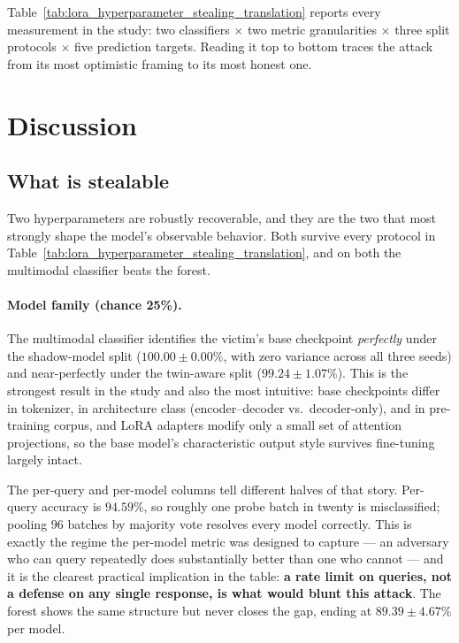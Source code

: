 \documentclass[11pt]{article}
\begin{document}
Table~\ref{tab:lora_hyperparameter_stealing_translation} reports every measurement in the
study: two classifiers $\times$ two metric granularities $\times$ three split protocols
$\times$ five prediction targets. Reading it top to bottom traces the attack from its most
optimistic framing to its most honest one.

\section{Discussion}

\subsection{What is stealable}

Two hyperparameters are robustly recoverable, and they are the two that most strongly
shape the model's observable behavior. Both survive every protocol in
Table~\ref{tab:lora_hyperparameter_stealing_translation}, and on both the multimodal
classifier beats the forest.

\paragraph{Model family (chance 25\%).} The multimodal classifier identifies the victim's
base checkpoint \emph{perfectly} under the shadow-model split ($100.00 \pm 0.00\%$, with
zero variance across all three seeds) and near-perfectly under the twin-aware split
($99.24 \pm 1.07\%$). This is the strongest result in the study and also the most
intuitive: base checkpoints differ in tokenizer, in architecture class (encoder--decoder
vs.\ decoder-only), and in pre-training corpus, and LoRA adapters modify only a small set
of attention projections, so the base model's characteristic output style survives
fine-tuning largely intact.

The per-query and per-model columns tell different halves of that story. Per-query
accuracy is $94.59\%$, so roughly one probe batch in twenty is misclassified; pooling $96$
batches by majority vote resolves every model correctly. This is exactly the regime the
per-model metric was designed to capture --- an adversary who can query repeatedly does
substantially better than one who cannot --- and it is the clearest practical implication
in the table: \textbf{a rate limit on queries, not a defense on any single response, is
what would blunt this attack}. The forest shows the same structure but never closes the
gap, ending at $89.39 \pm 4.67\%$ per model.
\end{document}

